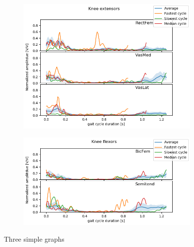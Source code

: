\documentclass[../main.tex]{subfiles}
\begin{document}
\begin{figure}
     \centering
     \begin{subfigure}[b]{0.6\textwidth}
         \centering
         \includegraphics[width=\textwidth]{img/results/norm_emg_knee_ext.png}
     \end{subfigure}
     \hfill
     \begin{subfigure}[b]{0.6\textwidth}
         \centering
         \includegraphics[width=\textwidth]{img/results/norm_emg_knee_flex.png}
     \end{subfigure}
    \caption{Three simple graphs}
    \label{fig:three graphs}
\end{figure}
\end{document}
